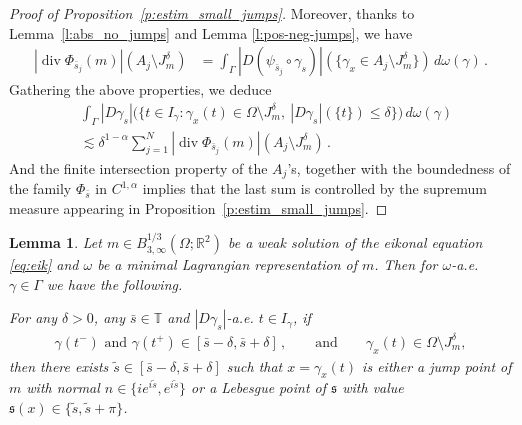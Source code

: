 \documentclass[fleqn
]{article}
\numberwithin{equation}{section}
\newcommand{\R}{{\mathbb R}}
\newcommand{\T}{{\mathbb T}}
\DeclareMathOperator{\dv}{div}
\newtheorem{lem}[thm]{Lemma}
\theoremstyle{definition}
\begin{document}
\begin{proof}[Proof of Proposition~\ref{p:estim_small_jumps}]
Moreover, thanks to Lemma~\ref{l:abs_no_jumps} and Lemma \ref{l:pos-neg-jumps}, we have
\begin{align*}
|\dv\Phi_{\bar s_j}(m)|(A_j \setminus J_m^\delta)
&
=\int_{\Gamma} |D(\psi_{\bar s_j}\circ\gamma_s)|(\lbrace \gamma_x\in A_j\setminus J_m^\delta\rbrace )\, d\omega(\gamma)\,.
\end{align*}
Gathering the above properties, we deduce
\begin{align*}
&
\int_{\Gamma}
|D\gamma_s|
\big(
\lbrace 
t\in I_\gamma\colon \gamma_x(t) \in \Omega \setminus J_m^\delta, \ 
|D\gamma_s|(\lbrace t\rbrace )\leq \delta\rbrace\big)
\,
d\omega(\gamma)
\\
&
\lesssim
\delta^{1-\alpha}\sum_{j=1}^N |\dv\Phi_{\bar s_j}(m)|(A_j\setminus J_m^\delta)\,.
\end{align*}
And the finite intersection property of the $A_j$'s, together with the boundedness of the family $\Phi_{\bar s}$ in $C^{1,\alpha}$ implies that the last sum is
controlled by the supremum measure appearing in Proposition~\ref{p:estim_small_jumps}.
\end{proof}





\begin{lem}\label{l:small_jumps}
Let $m\in B^{1/3}_{3,\infty}(\Omega;\R^2)$ be a weak solution of the eikonal equation \eqref{eq:eik} and $\omega$ be a minimal Lagrangian representation of $m$. Then for $\omega$-a.e. $\gamma\in\Gamma$ we have the following.

For any $\delta>0$, any $\bar s\in\T$ and $|D\gamma_s|$-a.e. $t\in I_\gamma$, 
if 
\begin{align*}
\gamma(t^-)\text{ and }\gamma(t^+)\in [\bar s - \delta,\bar s +\delta]\,,\qquad  \mbox{and}\qquad \gamma_x(t) \in \Omega \setminus J_m^\delta,
\end{align*}
 then there exists $\tilde s\in [\bar s - \delta,\bar s +\delta]$ such that
$x=\gamma_x(t)$ is either a jump point of $m$ with normal $n\in \lbrace ie^{i\tilde s},e^{i\tilde s}\rbrace$ or a Lebesgue point of $\mathfrak s$ with value $\mathfrak s(x)\in\lbrace \tilde s, \tilde s + \pi \rbrace$.
\end{lem}
\end{document}
